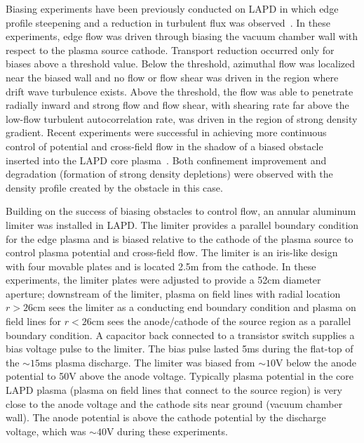 \documentclass[aps,prl,amsmath,amssymb,preprint,superscriptaddress]{revtex4}
\begin{document}
Biasing experiments have been previously conducted on LAPD in which
edge profile steepening and a reduction in turbulent flux was
observed~\cite{maggs07,carter09}. In these experiments, edge flow was
driven through biasing the vacuum chamber wall with respect to the
plasma source cathode.  Transport reduction occurred only for biases
above a threshold value.  Below the threshold, azimuthal flow was
localized near the biased wall and no flow or flow shear was driven in
the region where drift wave turbulence exists.  Above the threshold,
the flow was able to penetrate radially inward and strong flow and
flow shear, with shearing rate far above the low-flow turbulent
autocorrelation rate, was driven in the region of strong density
gradient.   Recent experiments were successful in achieving more continuous control of potential and cross-field flow in the shadow of a biased obstacle inserted into the LAPD core plasma~\cite{zhou12}.  Both confinement improvement and degradation (formation of strong density depletions) were observed with the density profile created by the obstacle in this case.  

Building on the success of biasing obstacles to control flow, an
annular aluminum limiter was installed in LAPD. The limiter provides a parallel boundary condition for the edge plasma and is biased relative to the cathode of the plasma source to control plasma potential and cross-field flow.  The limiter is
an iris-like design with four movable plates and is located 2.5m from
the cathode.  In these experiments, the limiter plates were adjusted
to provide a 52cm diameter aperture; downstream of the
limiter, plasma on field lines with radial location $r>26$cm sees the
limiter as a conducting end boundary condition and plasma on field
lines for $r<26$cm sees the anode/cathode of the source region as a
parallel boundary condition.  A capacitor back connected to a transistor switch supplies a bias voltage pulse to the limiter.  The
bias pulse lasted 5ms during the flat-top of the $\sim 15$ms plasma
discharge. The limiter was biased from $\sim 10$V below the anode
potential to 50V above the anode voltage.  Typically plasma potential
in the core LAPD plasma (plasma on field lines that connect to the
source region) is very close to the anode voltage and the cathode sits
near ground (vacuum chamber wall).  The anode potential is above the
cathode potential by the discharge voltage, which was $\sim 40$V during these experiments.
\end{document}
